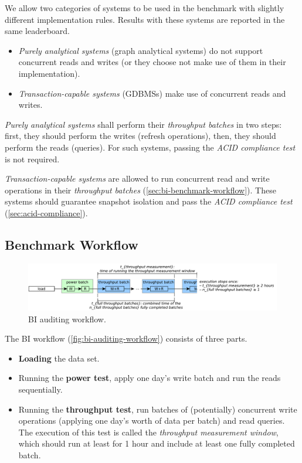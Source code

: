 We allow two categories of systems to be used in the benchmark with slightly different implementation rules.
Results with these systems are reported in the same leaderboard.

\begin{itemize}
    \item \emph{Purely analytical systems} (\eg graph analytical systems) do not support concurrent reads and writes (or they choose not make use of them in their \snbbi implementation).
    \item \emph{Transaction-capable systems} (\eg GDBMSs) make use of concurrent reads and writes.
\end{itemize}

\emph{Purely analytical systems} shall perform their \emph{throughput batches} in two steps:
first, they should perform the writes (refresh operations),
then, they should perform the reads (queries).
For such systems, passing the \emph{ACID compliance test} is not required.

\emph{Transaction-capable systems} are allowed to run concurrent read and write operations in their \emph{throughput batches} (\autoref{sec:bi-benchmark-workflow}).
These systems should guarantee snapshot isolation and pass the \emph{ACID compliance test} (\autoref{sec:acid-compliance}).

\subsection{Benchmark Workflow}
\label{sec:bi-benchmark-workflow}

\begin{figure}[htbp]
    \centering
    \includegraphics[scale=\yedscale]{figures/bi-auditing-workflow.pdf}
    \caption{BI auditing workflow.}
    \label{fig:bi-auditing-workflow}
\end{figure}

The BI workflow (\autoref{fig:bi-auditing-workflow}) consists of three parts.

\begin{itemize}
    \item \textbf{Loading} the data set.
    \item Running the \textbf{power test}, \ie apply one day's write batch and run the reads sequentially.
    \item Running the \textbf{throughput test}, \ie run batches of (potentially) concurrent write operations (applying one day's worth of data per batch) and read queries.
    The execution of this test is called the \emph{throughput measurement window}, which should
    run at least for 1 hour and
    include at least one fully completed batch.
\end{itemize}


